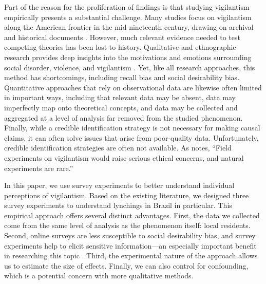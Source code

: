 \documentclass[12pt,ansiapaper]{article}
\begin{document}
Part of the reason for the proliferation of findings is that studying vigilantism empirically presents a substantial challenge. Many studies focus on vigilantism along the American frontier in the mid-nineteenth century, drawing on archival and historical documents  \citep{brown1975strain, courtwright2009violent, obert2018six}. However, much relevant evidence needed to test competing theories has been lost to history. Qualitative and ethnographic research provides deep insights into the motivations and emotions surrounding social disorder, violence, and vigilantism \citep{godoy2002lynchings}. Yet, like all research approaches, this method has shortcomings, including recall bias and social desirability bias. Quantitative approaches that rely on observational data are likewise often limited in important ways, including that relevant data may be absent, data may imperfectly map onto theoretical concepts, and data may be collected and aggregated at a level of analysis far removed from the studied phenomenon. Finally, while a credible identification strategy is not necessary for making causal claims, it can often solve issues that arise from poor-quality data. Unfortunately, credible identification strategies are often not available.  As \citet[17]{bateson2020politics} notes, ``Field experiments on vigilantism would raise serious ethical concerns, and natural experiments are rare.''

In this paper, we use survey experiments to better understand individual perceptions of vigilantism. Based on the existing literature, we designed three survey experiments to understand lynchings in Brazil in particular. This empirical approach offers several distinct advantages. First, the data we collected come from the same level of analysis as the phenomenon itself: local residents. Second, online surveys are less susceptible to social desirability bias, and survey experiments help to elicit sensitive information---an especially important benefit in researching this topic \citep{grimm2010social}. Third, the experimental nature of the approach allows us to estimate the size of effects. Finally, we can also control for confounding, which is a potential concern with more qualitative methods.
\end{document}
